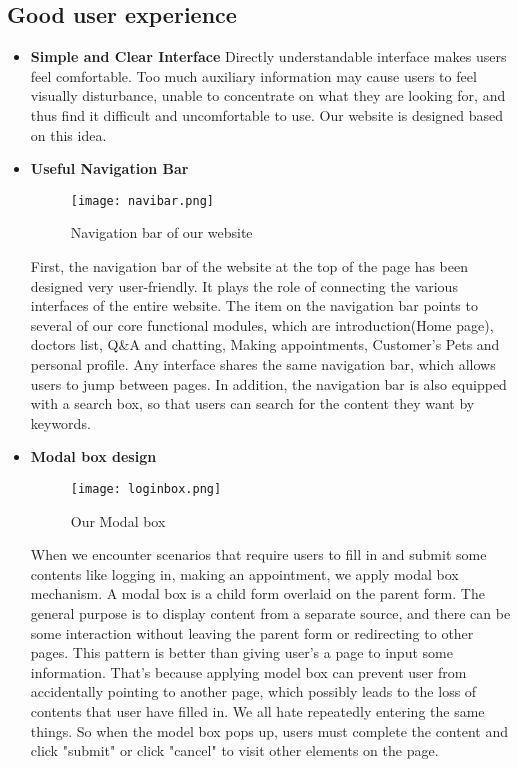 \documentclass[a4paper]{article}
\begin{document}
\subsection{Good user experience}
\begin{itemize}
    \item \textbf{Simple and Clear Interface}
    \newline
     Directly understandable interface makes users feel comfortable. Too much auxiliary information may cause users to feel visually disturbance, unable to concentrate on what they are looking for,  and thus find it difficult and uncomfortable to use. Our website is designed based on this idea.
     \item \textbf{Useful Navigation Bar}
     \newline
     \begin{figure}[h]
         \centering
         \texttt{[image: navibar.png]}
         \caption{Navigation bar of our website}
         \label{navibar}
     \end{figure}
     \newline
     First, the navigation bar of the website at the top of the page has been designed very user-friendly. It plays the role of connecting the various interfaces of the entire website. The item on the navigation bar points to several of our core functional modules, which are introduction(Home page), doctors list, Q\&A and chatting, Making appointments, Customer's Pets and personal profile. Any interface shares the same navigation bar, which allows users to jump between pages. In addition, the navigation bar is also equipped with a search box, so that users can search for the content they want by keywords.
     \item \textbf{Modal box design}
     \newline
      \begin{figure}[h]
         \centering
         \texttt{[image: loginbox.png]}
         \caption{Our Modal box}
         \label{navibar}
     \end{figure}
     When we encounter scenarios that require users to fill in and submit some contents like logging in, making an appointment, we apply modal box mechanism. A modal box is a child form overlaid on the parent form. The general purpose is to display content from a separate source, and there can be some interaction without leaving the parent form or redirecting to other pages. This pattern is better than giving user's a page to input some information. That's because applying model box can prevent user from accidentally pointing to another page, which possibly leads to the loss of contents that user have filled in. We all hate repeatedly entering the same things. So when the model box pops up, users must complete the content and click "submit" or click "cancel" to visit other elements on the page.

\end{itemize}
\end{document}
